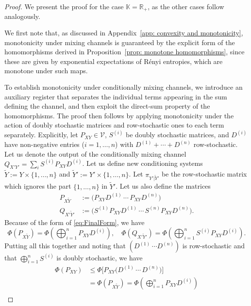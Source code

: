 \documentclass[aps,pra,11pt,onecolumn,nofootinbib,tightenlines]{revtex4-2}
\theoremstyle{definition}
\newcommand{\V}{\mathcal{V}}
\begin{document}
\begin{proof}
We present the proof for the case $\mathbb{K} = \mathbb{R}_+$, as the other cases follow analogously.

We first note that, as discussed in Appendix~\ref{app: convexity and monotonicity},
monotonicity under mixing channels is guaranteed by the explicit form of
the homomorphisms derived in Proposition~\ref{prop: monotone homomorphisms}, since
these are given by exponential expectations of R\'enyi entropies, which are
monotone under such maps.


To establish monotonicity under conditionally mixing channels, we introduce an auxiliary register that separates the individual terms appearing in the sum defining the channel, and then exploit the direct-sum property of the homomorphisms. The proof then follows by applying monotonicity under the action of doubly stochastic matrices and row-stochastic ones to each term separately.
Explicitly, let $P_{XY}\in\V$, $S^{(i)}$ be doubly stochastic matrices, and $D^{(i)}$ have non-negative entries ($i=1,\ldots,n$) with $D^{(1)}+\cdots+D^{(n)}$ row-stochastic. Let us denote the output of the conditionally mixing channel $Q_{X'Y'}=\sum_i S^{(i)}P_{XY}D^{(i)}$. Let us define new conditioning systems $\widetilde{Y}:=Y\times\{1,\ldots,n\}$ and $\widetilde{Y}':=Y'\times\{1,\ldots,n\}$.
Let $\pi_{Y'|\widetilde{Y}'}$ be the row-stochastic matrix which ignores the part $\{1,\ldots,n\}$ in $\widetilde{Y}'$. Let us also define the matrices
\begin{align}
P_{X\widetilde{Y}}&:=\big(P_{XY}D^{(1)}\,\cdots\,P_{XY}D^{(n)}\big)\\
Q_{X'\widetilde{Y}'}&:=\big(S^{(1)}P_{XY}D^{(1)}\,\cdots\,S^{(n)}P_{XY}D^{(n)}\big).
\end{align}
Because of the form of \eqref{eq:FinalForm}, %
we have
\begin{equation}
\Phi(P_{X\widetilde{Y}})=\Phi\left(\bigoplus_{i=1}^n P_{XY}D^{(i)}\right),\quad\Phi(Q_{X'\widetilde{Y}'})=\Phi\left(\bigoplus_{i=1}^n S^{(i)}P_{XY}D^{(i)}\right).
\end{equation}
Putting all this together and noting that $(D^{(1)}\,\cdots D^{(n)})$ is row-stochastic and that $\bigoplus_{i=1}^n S^{(i)}$ is doubly stochastic, we have
\begin{align}
\Phi(P_{XY})&\leq\Phi\big[P_{XY}\big(D^{(1)}\,\cdots\,D^{(n)}\big)\big]\\
&=\Phi(P_{X\widetilde{Y}})=\Phi\left(\bigoplus_{i=1}^n P_{XY}D^{(i)}\right)\\

\end{align}
\end{proof}
\end{document}
